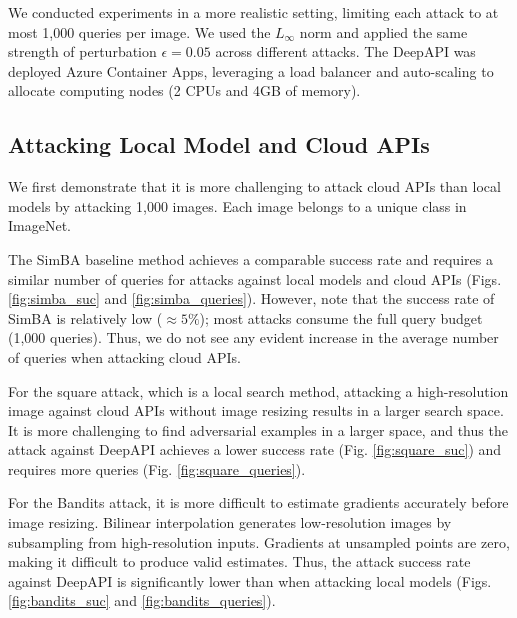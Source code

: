 We conducted experiments in a more realistic setting, limiting each attack to at most 1,000 queries per image. We used the $L_{\infty}$ norm and applied the same strength of perturbation $\epsilon=0.05$ across different attacks. The DeepAPI was deployed Azure Container Apps, leveraging a load balancer and auto-scaling to allocate computing nodes (2 CPUs and 4GB of memory).


\subsection{Attacking Local Model and Cloud APIs}

We first demonstrate that it is more challenging to attack cloud APIs than local models by attacking 1,000 images. Each image belongs to a unique class in ImageNet. 

The SimBA baseline method achieves a comparable success rate and requires a similar number of queries for attacks against local models and cloud APIs (Figs. \ref{fig:simba_suc} and \ref{fig:simba_queries}). However, note that the success rate of SimBA is relatively low ($\approx 5\%$); most attacks consume the full query budget (1,000 queries). Thus, we do not see any evident increase in the average number of queries when attacking cloud APIs.

For the square attack, which is a local search method, attacking a high-resolution image against cloud APIs without image resizing results in a larger search space. It is more challenging to find adversarial examples in a larger space, and thus the attack against DeepAPI achieves a lower success rate (Fig. \ref{fig:square_suc}) and requires more queries (Fig. \ref{fig:square_queries}). 

For the Bandits attack, it is more difficult to estimate gradients accurately before image resizing. Bilinear interpolation generates low-resolution images by subsampling from high-resolution inputs. Gradients at unsampled points are zero, making it difficult to produce valid estimates. Thus, the attack success rate against DeepAPI is significantly lower than when attacking local models (Figs. \ref{fig:bandits_suc} and \ref{fig:bandits_queries}). 


